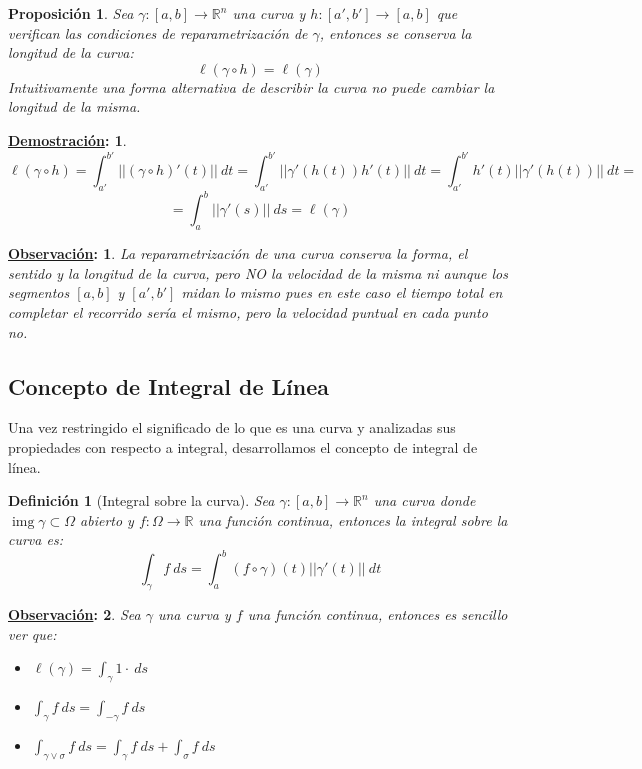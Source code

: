 \documentclass[10pt,a4paper,openright]{book}
\theoremstyle{break}
\newtheorem*{defi}{Definición}
\newtheorem*{prop}{Proposición}
\newtheorem*{demo}{\underline{Demostración}:}
\newtheorem*{obs}{\underline{Observación}:}
\DeclareMathOperator{\img}{img}
\newcommand{\dif}[1]{\ d#1}
\begin{document}
\begin{prop}
Sea $\gamma: \left[ a, b \right] \rightarrow \mathbb{R}^n$ una curva y $h: \left[ a', b' \right] \rightarrow \left[ a, b \right]$ que verifican las condiciones de reparametrización de $\gamma$, entonces se conserva la longitud de la curva: 
$$\ell \left( \gamma \circ h \right) = \ell \left( \gamma \right) $$
Intuitivamente una forma alternativa de describir la curva no puede cambiar la longitud de la misma.
\end{prop}
\begin{demo}
$$\ell \left( \gamma \circ h\right) = \int_{a'}^{b'} \lvert \lvert \left( \gamma \circ h \right)'\left( t \right) \rvert \rvert \dif{t} =  \int_{a'}^{b'} \lvert \lvert \gamma'\left( h\left( t \right) \right) h'\left( t \right) \rvert \rvert \dif{t} = \int_{a'}^{b'} h'\left( t \right) \lvert \lvert \gamma'\left( h\left( t \right) \right) \rvert \rvert \dif{t} = $$
$$= \int_{a}^{b} \lvert \lvert \gamma'\left( s \right) \rvert \rvert \dif{s} = \ell \left( \gamma \right) $$    
\end{demo}

\begin{obs}
La reparametrización de una curva conserva la forma, el sentido y la longitud de la curva, pero NO la velocidad de la misma ni aunque los segmentos $[a,b]$ y $[a',b']$ midan lo mismo pues en este caso el tiempo total en completar el recorrido sería el mismo, pero la velocidad puntual en cada punto no.
\end{obs}

\subsection{Concepto de Integral de Línea}
Una vez restringido el significado de lo que es una curva y analizadas sus propiedades con respecto a integral, desarrollamos el concepto de integral de línea.

\begin{defi}[Integral sobre la curva]
Sea $\gamma: \left[ a, b \right] \rightarrow \mathbb{R}^n$ una curva donde $\img \gamma \subset \Omega$ abierto y $f: \Omega \rightarrow \mathbb{R}$ una función continua, entonces la integral sobre la curva es:
\[
\int_{\gamma} f \dif{s} = \int_{a}^{b} \left( f \circ \gamma \right) \left( t \right) \lvert \lvert \gamma'\left( t \right) \rvert \rvert \dif{t} 
\]
\end{defi}

\begin{obs}
Sea $\gamma$ una curva y $f$ una función continua, entonces es sencillo ver que: 
\begin{itemize}
    \item $\ell \left( \gamma \right) = \int_{\gamma} 1 \cdot \dif{s}$
    \item $\int_{\gamma} f \dif{s} = \int_{-\gamma} f \dif{s}$
    \item $\int_{\gamma \lor \sigma} f \dif{s} = \int_{\gamma} f \dif{s} + \int_{\sigma} f \dif{s}$
\end{itemize}
\end{obs}
\end{document}
